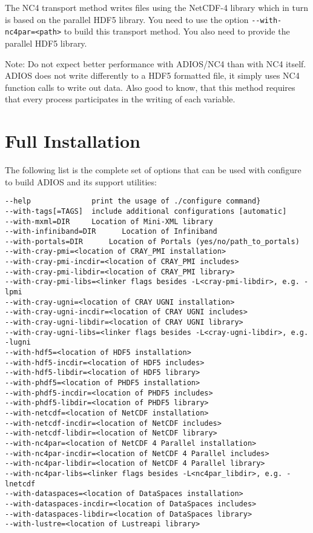The NC4 transport method writes files using the NetCDF-4 library which in turn 
is based on the parallel HDF5 library. You need to use the option 
\verb+--with-nc4par=<path>+ to build this transport method. 
You also need to provide the parallel HDF5 library. 

Note: Do not expect better performance with ADIOS/NC4 than with NC4 itself. ADIOS does not write differently to a HDF5 formatted file, it simply uses NC4 function calls to write out data. Also good to know, that this method requires that every process participates in the writing of each variable. 

\section{Full Installation}

The following list is the complete set of options that can be used with 
configure to build ADIOS and its support utilities:

\begin{lstlisting}
--help              print the usage of ./configure command}
--with-tags[=TAGS]  include additional configurations [automatic]
--with-mxml=DIR     Location of Mini-XML library
--with-infiniband=DIR      Location of Infiniband
--with-portals=DIR      Location of Portals (yes/no/path_to_portals)
--with-cray-pmi=<location of CRAY_PMI installation>
--with-cray-pmi-incdir=<location of CRAY_PMI includes>
--with-cray-pmi-libdir=<location of CRAY_PMI library>
--with-cray-pmi-libs=<linker flags besides -L<cray-pmi-libdir>, e.g. -lpmi
--with-cray-ugni=<location of CRAY UGNI installation>
--with-cray-ugni-incdir=<location of CRAY UGNI includes>
--with-cray-ugni-libdir=<location of CRAY UGNI library>
--with-cray-ugni-libs=<linker flags besides -L<cray-ugni-libdir>, e.g. -lugni
--with-hdf5=<location of HDF5 installation>
--with-hdf5-incdir=<location of HDF5 includes>
--with-hdf5-libdir=<location of HDF5 library>
--with-phdf5=<location of PHDF5 installation>
--with-phdf5-incdir=<location of PHDF5 includes>
--with-phdf5-libdir=<location of PHDF5 library>
--with-netcdf=<location of NetCDF installation>
--with-netcdf-incdir=<location of NetCDF includes>
--with-netcdf-libdir=<location of NetCDF library>
--with-nc4par=<location of NetCDF 4 Parallel installation>
--with-nc4par-incdir=<location of NetCDF 4 Parallel includes>
--with-nc4par-libdir=<location of NetCDF 4 Parallel library>
--with-nc4par-libs=<linker flags besides -L<nc4par_libdir>, e.g. -lnetcdf
--with-dataspaces=<location of DataSpaces installation>
--with-dataspaces-incdir=<location of DataSpaces includes>
--with-dataspaces-libdir=<location of DataSpaces library>
--with-lustre=<location of Lustreapi library>
\end{lstlisting}

